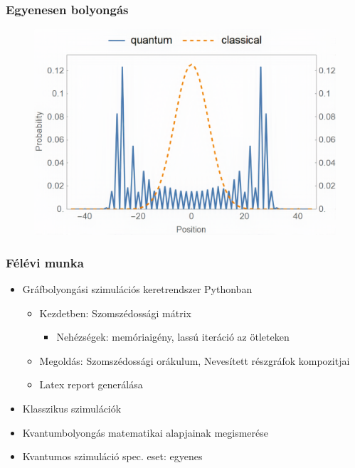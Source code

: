\documentclass[aspectratio=169]{beamer}
\begin{document}
\begin{frame}
  \frametitle{Egyenesen bolyongás}
  \begin{figure}[H]
    \centering
    \includegraphics[width=0.6\linewidth]{./figures/teve.png}
  \end{figure}
\end{frame}

\begin{frame}
  \frametitle{Félévi munka}
  \begin{itemize}
    \item Gráfbolyongási szimulációs keretrendszer Pythonban
    \begin{itemize}
      \item Kezdetben: Szomszédossági mátrix
      \begin{itemize}
        \item Nehézségek: memóriaigény, lassú iteráció az ötleteken
      \end{itemize}
      \item Megoldás: Szomszédossági orákulum, Nevesített részgráfok kompozitjai
      \item Latex report generálása
    \end{itemize}
    \item Klasszikus szimulációk
    \item Kvantumbolyongás matematikai alapjainak megismerése
    \item Kvantumos szimuláció spec. eset: egyenes
  \end{itemize}
\end{frame}
\end{document}
